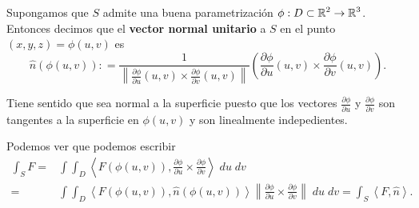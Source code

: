 \begin{definition}
Supongamos que $\displaystyle S $ admite una buena parametrización $\displaystyle \phi : D \subset \mathbb{R}^{2} \to \mathbb{R}^{3} $. Entonces decimos que el \textbf{vector normal unitario} a $\displaystyle S $ en el punto $\displaystyle \left(x,y,z\right)=\phi\left(u,v\right) $ es
\[\hat{n}\left(\phi\left(u,v\right)\right) : = \frac{1}{\left\|\frac{\partial \phi}{\partial u}\left(u,v\right)\times \frac{\partial \phi}{\partial v}\left(u,v\right)\right\|}\left(\frac{\partial \phi}{\partial u}\left(u,v\right)\times \frac{\partial \phi}{\partial v}\left(u,v\right)\right) .\]
\end{definition}
\begin{observation}
Tiene sentido que sea normal a la superficie puesto que los vectores $\displaystyle \frac{\partial \phi}{\partial u} $ y $\displaystyle \frac{\partial \phi}{\partial v} $ son tangentes a la superficie en $\displaystyle \phi\left(u,v\right) $ y son linealmente indepedientes.
\end{observation}
\begin{observation}
Podemos ver que podemos escribir
\[
\begin{split}
	\int _{S}F = & \int \int _{D}\left\langle F\left(\phi\left(u,v\right)\right), \frac{\partial \phi}{\partial u} \times \frac{\partial \phi}{\partial v} \right\rangle  \; du \; dv \\
	= & \int \int _{D}\left\langle F\left(\phi\left(u,v\right)\right), \hat{n}\left(\phi\left(u,v\right)\right) \right\rangle \left\|\frac{\partial \phi}{\partial u} \times \frac{\partial \phi}{\partial v}\right\| \; du \; dv = \int _{S} \left\langle F, \hat{n} \right\rangle .
\end{split}
\]
\end{observation}

